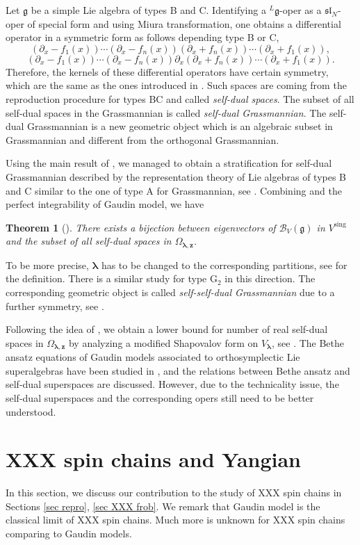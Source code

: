 \documentclass[11pt,reqno]{amsart}
\numberwithin{equation}{section}
\newtheorem{thm}{Theorem}[section]
\theoremstyle{definition}
\theoremstyle{remark}
\newcommand{\mc}{\mathcal}
\newcommand{\g}{\mathfrak{g}}
\newcommand{\sing}{{\mathrm{sing}}}
\newcommand{\pa}{\partial}
\newcommand{\bla}{\bm\lambda}
\begin{document}
Let $\g$ be a simple Lie algebra of types B and C. Identifying a $^L\g$-oper as a $\mathfrak{sl}_N$-oper of special form and using Miura transformation, one obtains a differential operator in a symmetric form as follows depending type B or C,
\[
(\pa_x-f_1(x))\cdots (\pa_x-f_{n}(x))(\pa_x+f_n(x))\cdots (\pa_x+f_{1}(x)),
\]
\[
(\pa_x-f_1(x))\cdots (\pa_x-f_{n}(x))\pa_x(\pa_x+f_n(x))\cdots (\pa_x+f_{1}(x)).
\]
Therefore, the kernels of these differential operators have certain symmetry, which are the same as the ones introduced in \cite[Section 6]{MV:2004}. Such spaces are coming from the reproduction procedure for types BC and called \emph{self-dual spaces}. The subset of all self-dual spaces in the Grassmannian is called \emph{self-dual Grassmannian}. The self-dual Grassmannian is a new geometric object which is an algebraic subset in Grassmannian and different from the orthogonal Grassmannian.

Using the main result of \cite{Ryb:2018}, we managed to obtain a stratification for self-dual Grassmannian described by the representation theory of Lie algebras of types B and C similar to the one of type A for Grassmannian, see \cite[Section 4.4]{LMV:2018}. Combining \cite[Theorem 4.5]{LMV:2018} and the perfect integrability of Gaudin model, we have
\begin{thm}[\cite{Lu:2019}]
There exists a bijection between eigenvectors of $\mc B_V(\g)$ in $V^\sing$ and the subset of all self-dual spaces in $\Omega_{\bla,\bm z}$.
\end{thm}

To be more precise, $\bla$ has to be changed to the corresponding partitions, see \cite[Section 4]{LMV:2018} for the definition. There is a similar study for type G$_2$ in this direction. The corresponding geometric object is called \emph{self-self-dual Grassmannian} due to a further symmetry, see \cite{LM:2018}.

Following the idea of \cite{MT:2016}, we obtain a lower bound for number of real self-dual spaces in $\Omega_{\bla,\bm z}$ by analyzing a modified Shapovalov form on $V_{\bla}$, see \cite{Lu:2018}. The Bethe ansatz equations of Gaudin models associated to orthosymplectic Lie superalgebras have been studied in \cite{LM:2021}, and the relations between Bethe ansatz and self-dual superspaces are discussed. However, due to the technicality issue, the self-dual superspaces and the corresponding opers still need to be better understood.


\section{XXX spin chains and Yangian}
In this section, we discuss our contribution \cite{HLM:2019,LM:2019} to the study of XXX spin chains in Sections \ref{sec repro}, \ref{sec XXX frob}. We remark that Gaudin model is the classical limit of XXX spin chains. Much more is unknown for XXX spin chains comparing to Gaudin models.
\end{document}

